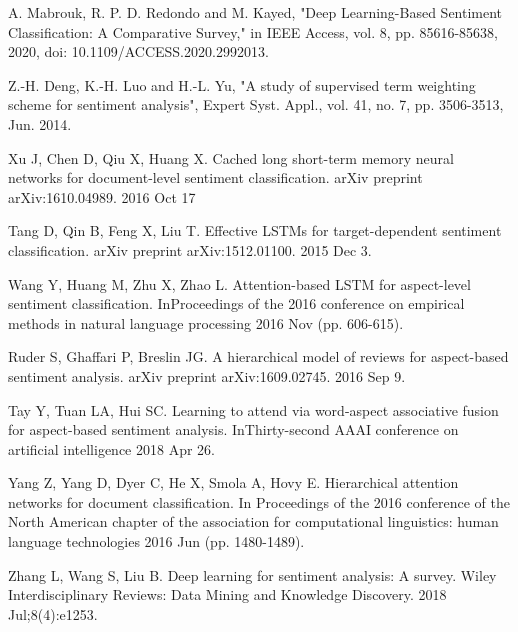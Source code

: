 \documentclass[journal]{IEEEtran}
\begin{document}
\begin{thebibliography}{20}


A. Mabrouk, R. P. D. Redondo and M. Kayed, "Deep Learning-Based Sentiment Classification: A Comparative Survey," in IEEE Access, vol. 8, pp. 85616-85638, 2020, doi: 10.1109/ACCESS.2020.2992013.

Z.-H. Deng, K.-H. Luo and H.-L. Yu, "A study of supervised term weighting scheme for sentiment analysis", Expert Syst. Appl., vol. 41, no. 7, pp. 3506-3513, Jun. 2014.


Xu J, Chen D, Qiu X, Huang X. Cached long short-term memory neural networks for document-level sentiment classification. arXiv preprint arXiv:1610.04989. 2016 Oct 17


Tang D, Qin B, Feng X, Liu T. Effective LSTMs for target-dependent sentiment classification. arXiv preprint arXiv:1512.01100. 2015 Dec 3.


Wang Y, Huang M, Zhu X, Zhao L. Attention-based LSTM for aspect-level sentiment classification. InProceedings of the 2016 conference on empirical methods in natural language processing 2016 Nov (pp. 606-615).


Ruder S, Ghaffari P, Breslin JG. A hierarchical model of reviews for aspect-based sentiment analysis. arXiv preprint arXiv:1609.02745. 2016 Sep 9.


Tay Y, Tuan LA, Hui SC. Learning to attend via word-aspect associative fusion for aspect-based sentiment analysis. InThirty-second AAAI conference on artificial intelligence 2018 Apr 26.


Yang Z, Yang D, Dyer C, He X, Smola A, Hovy E. Hierarchical attention networks for document classification. In Proceedings of the 2016 conference of the North American chapter of the association for computational linguistics: human language technologies 2016 Jun (pp. 1480-1489).


Zhang L, Wang S, Liu B. Deep learning for sentiment analysis: A survey. Wiley Interdisciplinary Reviews: Data Mining and Knowledge Discovery. 2018 Jul;8(4):e1253.






\end{thebibliography}
\end{document}
